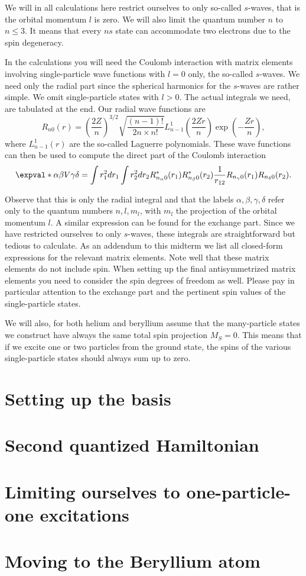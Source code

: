 \documentclass{article}
\begin{document}
We will in all calculations here restrict ourselves to only so-called \(s\)-waves, that is the orbital momentum \(l\) is zero.
We will also limit the quantum number \(n\) to \(n \le 3\).
It means that every \(ns\) state can accommodate two electrons due to the spin degeneracy.

In the calculations you will need the Coulomb interaction with matrix elements involving single-particle wave functions with \(l = 0\) only, the
so-called \(s\)-waves.
We need only the radial part since the spherical harmonics for the \(s\)-waves are rather simple.
We omit single-particle states with \(l > 0\).
The actual integrals we need, are tabulated at the end.
Our radial wave functions are
\begin{equation*}
    R_{n0}(r) = \left( \frac{2Z}{n} \right)^{3/2} \sqrt{\frac{(n-1)!}{2n\times n!}} L_{n-1}^1 \left( \frac{2Zr}{n} \right) \exp{\left( -\frac{Zr}{n} \right)},
\end{equation*}
where \(L_{n-1}^1(r)\) are the so-called Laguerre polynomials.
These wave functions can then be used to compute the direct part of the Coulomb interaction
\begin{equation*}
    \expval*{\alpha\beta}{V}{\gamma\delta} = \int r_1^2 dr_1 \int r_2^2 dr_2 R_{n_{\alpha} 0}^*(r_1) R_{n_{\beta} 0}^*(r_2) \frac{1}{r_{12}}R_{n_{\gamma} 0}(r_1) R_{n_{\delta} 0}(r_2).
\end{equation*}

Observe that this is only the radial integral and that the labels \( \alpha,\beta,\gamma,\delta \) refer only to the quantum numbers \(n,l,m_l\), with \(m_l\) the projection of the orbital momentum \(l\).
A similar expression can be found for the exchange part.
Since we have restricted ourselves to only \(s\)-waves, these integrals are straightforward but tedious to calculate.
As an addendum to this midterm we list all closed-form expressions for the relevant matrix elements.
Note well that these matrix elements do not include spin.
When setting up the final antisymmetrized matrix elements you need to consider the spin degrees of freedom as well.
Please pay in particular attention to the exchange part and the pertinent spin values of the single-particle states.

We will also, for both helium and beryllium assume that the many-particle states we construct have always the same total spin projection \(M_S = 0\).
This means that if we excite one or two particles from the ground state, the spins of the various single-particle states should always sum up to zero.

\section{Setting up the basis}


\section{Second quantized Hamiltonian}
% 

\section{Limiting ourselves to one-particle-one excitations}


\section{Moving to the Beryllium atom}

\end{document}
